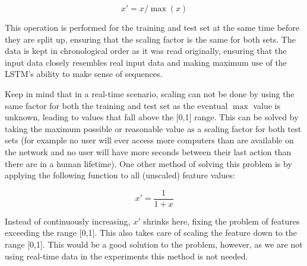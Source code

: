 $$ x' = x / \max (x) $$

This operation is performed for the training and test set at the same time before they are split up, ensuring that the scaling factor is the same for both sets. The data is kept in chronological order as it was read originally, ensuring that the input data closely resembles real input data and making maximum use of the LSTM's ability to make sense of sequences.

Keep in mind that in a real-time scenario, scaling can not be done by using the same factor for both the training and test set as the eventual \(\max \) value is unknown, leading to values that fall above the [0,1] range. This can be solved by taking the maximum possible or reasonable value as a scaling factor for both test sets (for example no user will ever access more computers than are available on the network and no user will have more seconds between their last action than there are in a human lifetime). One other method of solving this problem is by applying the following function to all (unscaled) feature values:

$$ x' = \dfrac{1}{1+x} $$

Instead of continuously increasing, \(x'\) shrinks here, fixing the problem of features exceeding the range [0,1]. This also takes care of scaling the feature down to the range [0,1]. This would be a good solution to the problem, however, as we are not using real-time data in the experiments this method is not needed.

